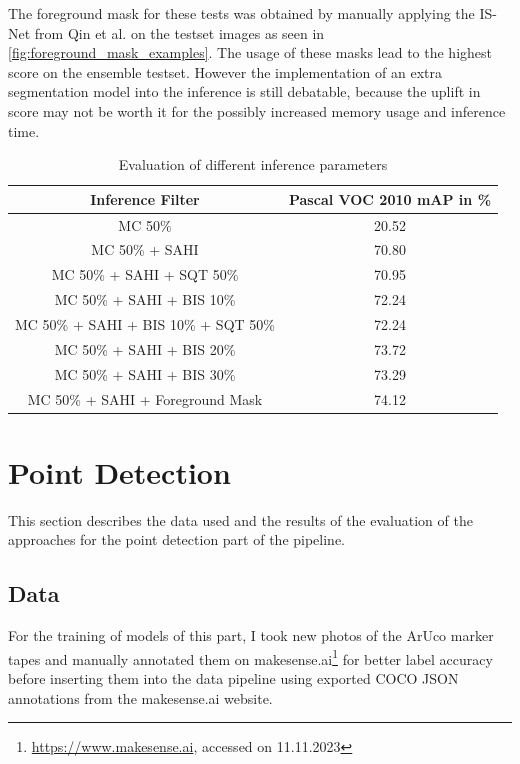 \documentclass[10pt]{book}
\begin{document}
The foreground mask for these tests was obtained by manually applying the IS-Net from Qin et al. \cite{qin2022} on the testset images as seen in \autoref{fig:foreground_mask_examples}. The usage of these masks lead to the highest score on the ensemble testset. However the implementation of an extra segmentation model into the inference is still debatable, because the uplift in score may not be worth it for the possibly increased memory usage and inference time.

\begin{table}
  \begin{tabular}{ c c }
   Inference Filter & Pascal VOC 2010 \ac{mAP} in \% \\ 
   \hline
   \ac{MC} 50\% & 20.52 \\
   \ac{MC} 50\% + \ac{SAHI} & 70.80 \\
   \ac{MC} 50\% + \ac{SAHI} + \ac{SQT} 50\% & 70.95 \\
   \ac{MC} 50\% + \ac{SAHI} + \ac{BIS} 10\% & 72.24 \\
   \ac{MC} 50\% + \ac{SAHI} + \ac{BIS} 10\% + \ac{SQT} 50\% & 72.24 \\
   \ac{MC} 50\% + \ac{SAHI} + \ac{BIS} 20\% & 73.72 \\
   \ac{MC} 50\% + \ac{SAHI} + \ac{BIS} 30\% & 73.29 \\
   \ac{MC} 50\% + \ac{SAHI} + Foreground Mask & 74.12 \\
   \hline
  \end{tabular}
  \caption{\label{tab:inference_parameters}Evaluation of different inference parameters}
\end{table} %

\section{Point Detection}

This section describes the data used and the results of the evaluation of the approaches for the point detection part of the pipeline.

\subsection{Data}

For the training of models of this part, I took new photos of the \ac{ArUco} marker tapes and manually annotated them on makesense.ai\footnote{\url{https://www.makesense.ai}, accessed on 11.11.2023} for better label accuracy before inserting them into the data pipeline using exported \ac{COCO} \ac{JSON} annotations from the makesense.ai website.
\end{document}
